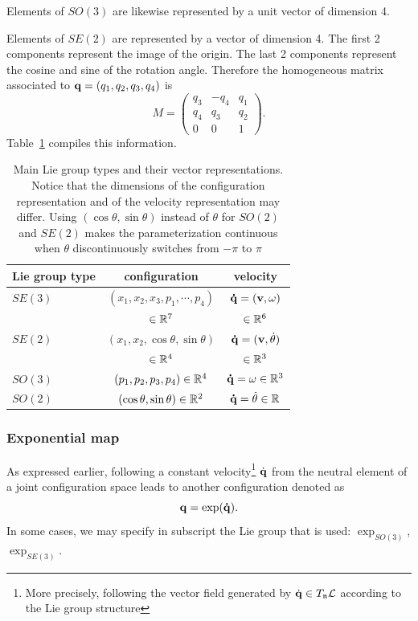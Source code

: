 Elements of $SO(3)$ are likewise represented by a unit vector of dimension 4.

Elements of $SE(2)$ are represented by a vector of dimension 4. The first 2 components represent the image of the origin. The last 2 components represent the cosine and sine of the rotation angle. Therefore the homogeneous matrix associated to $\mathbf{q}=(q_1,q_2,q_3,q_4)$ is
$$
M = \left(\begin{array}{lll}
  q_3 & -q_4 & q_1 \\
  q_4 &  q_3 & q_2 \\
  0   &  0  & 1
\end{array}\right).
$$
Table~\ref{tab:vector representation} compiles this information.
\begin{table}
  \begin{tabular}{|l|c|c|}
    \hline
    Lie group type & configuration & velocity\\
    \hline
    $SE(3)$ & $(x_1,x_2,x_3,p_1,\cdots,p_4)$ & $\mathbf{\dot{q}}=(\mathbf{v},\omega)$ \\
            & $\in\mathbb{R}^7$                 & $\in\mathbb{R}^6$ \\
    $SE(2)$ & $(x_1,x_2,\cos\theta,\sin\theta)$ & $\mathbf{\dot{q}}=(\mathbf{v},\dot{\theta})$\\
            & $\in\mathbb{R}^4$                 & $\in\mathbb{R}^3$ \\
    $SO(3)$ & $(p_1,p_2,p_3,p_4)\in\mathbb{R}^4$ & $\mathbf{\dot{q}}=\omega\in\mathbb{R}^3$\\
    $SO(2)$ & $(\cos\theta,\sin\theta)\in\mathbb{R}^2$ & $\mathbf{\dot{q}}=\dot{\theta}\in\mathbb{R}$\\
    \hline
  \end{tabular}
  \caption{Main Lie group types and their vector representations. Notice that the dimensions of the configuration representation and of the velocity representation may differ. {\color{blue} Using $(\cos\theta,\sin\theta)$ instead of $\theta$ for $SO(2)$ and $SE(2)$ makes the parameterization continuous when $\theta$ discontinuously switches from $-\pi$ to $\pi$}}
  \label{tab:vector representation}
\end{table}

\subsubsection{Exponential map}

As expressed earlier, following a constant velocity\footnote{More precisely, following the vector field generated by $\dot{\mathbf{q}}\in T_{\mathfrak{n}}\mathcal{L}$ according to the Lie group structure} $\dot{\mathbf{q}}$ from the neutral element of a joint configuration space leads to another configuration denoted as
$$
\mathbf{q} = \exp(\mathbf{\dot{q}}).
$$
In some cases, we may specify in subscript the Lie group that is used: \href{https://github.com/stack-of-tasks/pinocchio/blob/f8f3b9a24eab527df79650e3dc73410f9a46a2b2/src/spatial/explog.hpp\#L34}{$\exp_{SO(3)}$}, \href{https://github.com/stack-of-tasks/pinocchio/blob/f8f3b9a24eab527df79650e3dc73410f9a46a2b2/src/spatial/explog.hpp\#L236}{$\exp_{SE(3)}$}.

